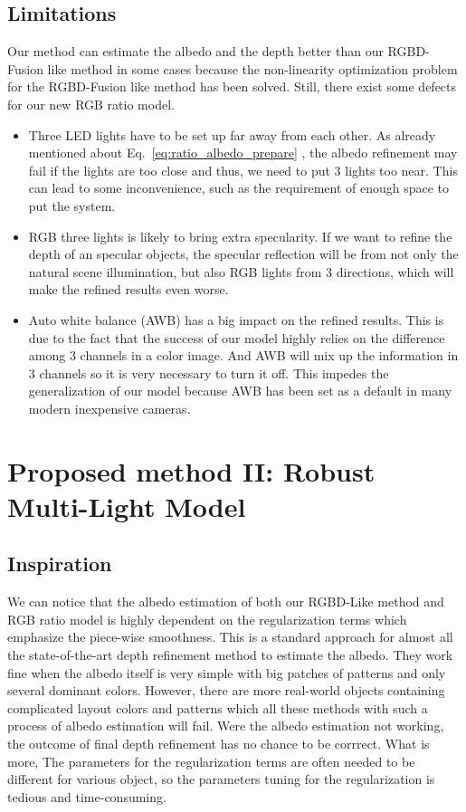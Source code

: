 \subsection{Limitations}
Our method can estimate the albedo and the depth better than our RGBD-Fusion like method in some cases because the non-linearity optimization problem for the RGBD-Fusion like method has been solved.
Still, there exist some defects for our new RGB ratio model.
\begin{itemize}
\item Three LED lights have to be set up far away from each other.
	As already mentioned about Eq.~\ref{eq:ratio_albedo_prepare} , the albedo refinement may fail if the lights are too close and thus, we need to put 3 lights too near. 
	This can lead to some inconvenience, such as the requirement of enough space to put the system.
\item RGB three lights is likely to bring extra specularity.
	 If we want to refine the depth of an specular objects, the specular reflection will be from not only the natural scene illumination, but also RGB lights from 3 directions, which will make the refined results even worse.
	 
\item Auto white balance (AWB) has a big impact on the refined results.
	This is due to the fact that the success of our model highly relies on the difference among 3 channels in a color image.
	And AWB will mix up the information in 3 channels so it is very necessary to turn it off.
	This impedes the generalization of our model because AWB has been set as a default in many modern inexpensive cameras.
\end{itemize}


\section{Proposed method II: Robust Multi-Light Model}

\subsection{Inspiration}
We can notice that the albedo estimation of both our RGBD-Like method and RGB ratio model is highly dependent on the regularization terms which emphasize the piece-wise smoothness.
This is a standard approach for almost all the state-of-the-art depth refinement method to estimate the albedo.
They work fine when the albedo itself is very simple with big patches of patterns and only several dominant colors.
However, there are more real-world objects containing complicated layout colors and patterns which all these methods with such a process of albedo estimation will fail.
Were the albedo estimation not working, the outcome of final depth refinement has no chance to be corrrect. 
What is more, The parameters for the regularization terms are often needed to be different for various object, so the parameters tuning for the regularization is tedious and time-consuming.

